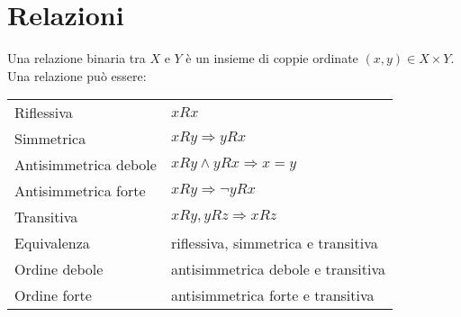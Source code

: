 \section{Relazioni}
Una relazione binaria tra $X$ e $Y$ è un insieme di coppie ordinate $(x,y)\in X\times Y$. Una relazione può essere:
\begin{tabular}{ll}
	Riflessiva & $xRx$ \\
	Simmetrica & $xRy \Rightarrow yRx$ \\
	Antisimmetrica debole & $xRy \wedge yRx \Rightarrow x=y$ \\
	Antisimmetrica forte & $xRy \Rightarrow \neg yRx$ \\
	Transitiva & $xRy, yRz \Rightarrow xRz$ \\
    Equivalenza & riflessiva, simmetrica e transitiva \\
    Ordine debole & antisimmetrica debole e transitiva \\
    Ordine forte & antisimmetrica forte e transitiva \\
\end{tabular}
